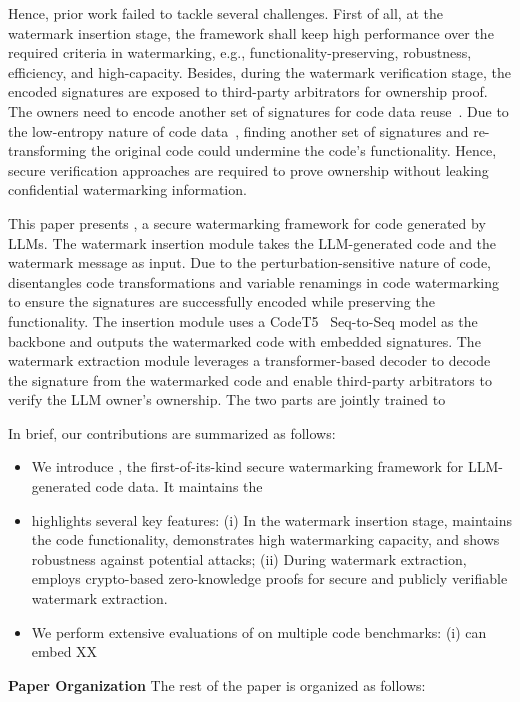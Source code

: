 Hence, prior work failed to tackle several challenges. First of all, 
at the watermark insertion stage, the framework shall keep high performance over the required criteria in watermarking, e.g., functionality-preserving, robustness, efficiency, and high-capacity. 
Besides, during the watermark verification stage, the encoded signatures are exposed to third-party arbitrators for ownership proof. The owners need to encode another set of signatures for code data reuse~\cite{sheybani2023zkrownn}. Due to the low-entropy nature of code data~\cite{lee2023wrote}, finding another set of signatures and re-transforming the original code could undermine the code's functionality. Hence, secure verification approaches are required to prove ownership without leaking confidential watermarking information. 

This paper presents \sys, a secure watermarking framework for code generated by LLMs. The watermark insertion module takes the LLM-generated code and the watermark message as input. 
Due to the perturbation-sensitive nature of code, \sys{} disentangles code transformations and variable renamings in code watermarking~\cite{yang2024srcmarker} to ensure the signatures are successfully encoded while preserving the functionality. The insertion module uses a CodeT5~\cite{wang2021codet5} Seq-to-Seq model as the backbone and outputs the watermarked code with embedded signatures. The watermark extraction module leverages a transformer-based decoder to decode the signature from the watermarked code and enable third-party arbitrators to verify the LLM owner's ownership. The two parts are jointly trained to 

In brief, our contributions are summarized as follows:
\begin{itemize}
    \item We introduce \sys, the first-of-its-kind secure watermarking framework for LLM-generated code data. It maintains the  
    
    \item \sys{} highlights several key features: (i) In the watermark insertion stage, \sys{} maintains the code functionality, demonstrates high watermarking capacity, and shows robustness against potential attacks; (ii) During watermark extraction, \sys{} employs crypto-based zero-knowledge proofs for secure and publicly verifiable watermark extraction.
    
    \item  We perform extensive evaluations of \sys{} on multiple code benchmarks: (i) \sys{} can embed XX 
     
\end{itemize}


\textbf{Paper Organization} The rest of the paper is organized as follows: 